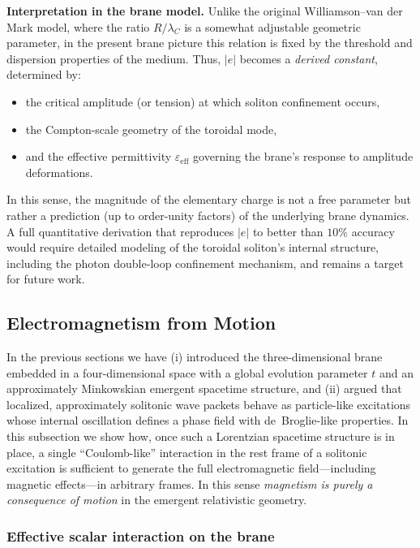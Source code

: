 \textbf{Interpretation in the brane model.}
Unlike the original Williamson--van der Mark model, where the ratio
$R/\lambda_C$ is a somewhat adjustable geometric parameter, in the present
brane picture this relation is fixed by the threshold and dispersion
properties of the medium. Thus, $|e|$ becomes a \emph{derived constant},
determined by:
\begin{itemize}
\tightlist
\item
  the critical amplitude (or tension) at which soliton confinement occurs,
\item
  the Compton-scale geometry of the toroidal mode,
\item
  and the effective permittivity $\varepsilon_{\mathrm{eff}}$ governing
  the brane's response to amplitude deformations.
\end{itemize}
In this sense, the magnitude of the elementary charge is not a free
parameter but rather a prediction (up to order-unity factors) of the
underlying brane dynamics. A full quantitative derivation that reproduces
$|e|$ to better than $10\%$ accuracy would require detailed modeling of
the toroidal soliton's internal structure, including the photon
double-loop confinement mechanism, and remains a target for future work.

\subsection{Electromagnetism from Motion}
\label{sec:em-from-motion}

In the previous sections we have (i) introduced the three-dimensional
brane embedded in a four-dimensional space with a global evolution
parameter $t$ and an approximately Minkowskian emergent spacetime
structure, and (ii) argued that localized, approximately solitonic
wave packets behave as particle-like excitations whose internal
oscillation defines a phase field with de~Broglie-like properties.
In this subsection we show how, once such a Lorentzian spacetime
structure is in place, a single ``Coulomb-like'' interaction in the
rest frame of a solitonic excitation is sufficient to generate the
full electromagnetic field---including magnetic effects---in arbitrary
frames. In this sense \emph{magnetism is purely a consequence of
motion} in the emergent relativistic geometry.

\subsubsection{Effective scalar interaction on the brane}

